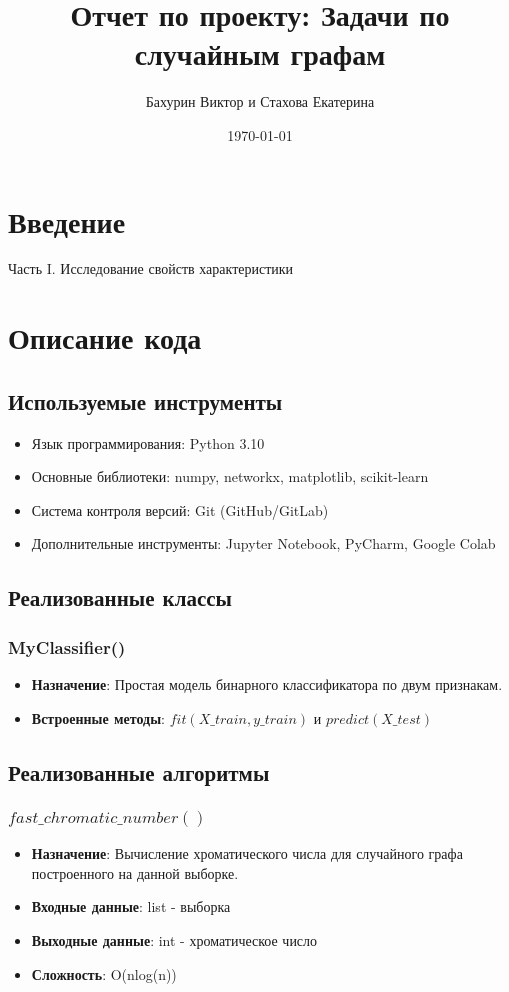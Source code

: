\documentclass[a4paper, 12pt]{article}
\title{Отчет по проекту: Задачи по случайным графам}
\author{Бахурин Виктор и Стахова Екатерина}
\date{\today}
\begin{document}
\maketitle
\tableofcontents

\section{Введение}
Часть I. Исследование свойств характеристики

\section{Описание кода}
\subsection{Используемые инструменты}
\begin{itemize}
    \item Язык программирования: Python 3.10
    \item Основные библиотеки: numpy, networkx, matplotlib, scikit-learn
    \item Система контроля версий: Git (GitHub/GitLab)
    \item Дополнительные инструменты: Jupyter Notebook, PyCharm, Google Colab
\end{itemize}

\subsection{Реализованные классы}
\subsubsection{MyClassifier()}
\begin{itemize}
    \item \textbf{Назначение}: Простая модель бинарного классификатора по двум признакам.
    \item \textbf{Встроенные методы}: $fit(X\_train, y\_train)$ и $predict(X\_test)$
\end{itemize}

\subsection{Реализованные алгоритмы}
\subsubsection{$fast\_chromatic\_number()$}
\begin{itemize}
    \item \textbf{Назначение}: Вычисление хроматического числа для случайного графа построенного на данной выборке.
    \item \textbf{Входные данные}: list - выборка
    \item \textbf{Выходные данные}: int - хроматическое число
    \item \textbf{Сложность}: O(nlog(n))
\end{itemize}
\end{document}
